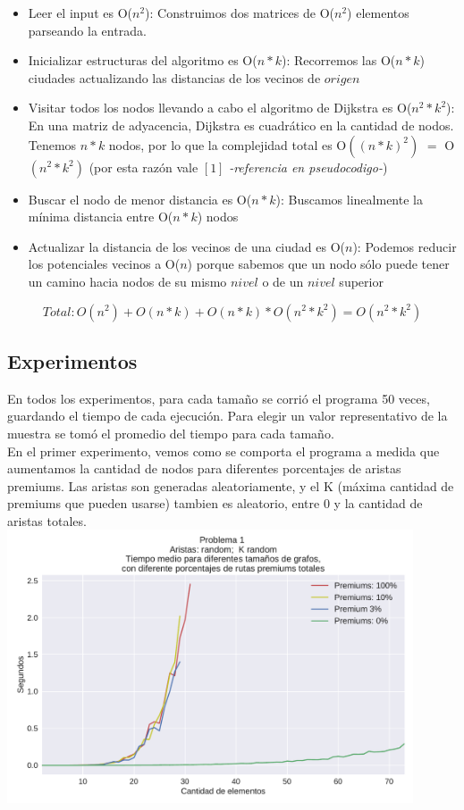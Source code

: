 \begin{itemize}
	\item Leer el input es O($n^2$): Construimos dos matrices de O($n^2$) elementos parseando la entrada.
	\item Inicializar estructuras del algoritmo es O($n*k$): Recorremos las O($n*k$) ciudades actualizando las distancias de los vecinos de $origen$
	\item Visitar todos los nodos llevando a cabo el algoritmo de Dijkstra es O($n^2*k^2$): En una matriz de adyacencia, Dijkstra es cuadrático en la cantidad de nodos. Tenemos $n*k$ nodos, por lo que la complejidad total es O$((n*k)^2)$ $=$ O$(n^2*k^2)$ (por esta razón vale  \label{whilejust}\hyperref[whileback]{$[1]$} \textit{-referencia en pseudocodigo-})
	\item Buscar el nodo de menor distancia es O($n*k$):  Buscamos linealmente la mínima distancia entre O($n*k$) nodos
	\item Actualizar la distancia de los vecinos de una ciudad es O($n$): Podemos reducir los potenciales vecinos a O($n$) porque sabemos que un nodo sólo puede tener un camino hacia nodos de su mismo $nivel$ o de un $nivel$ superior
\end{itemize}

$$Total:  O(n^2) + O(n*k) + O(n*k) * O(n^2*k^2) = O(n^2*k^2) $$

\subsection{Experimentos}

En todos los experimentos, para cada tamaño se corrió el programa 50 veces, guardando el tiempo de cada ejecución. Para elegir un valor representativo de la muestra se tomó el promedio del tiempo para cada tamaño. \\

En el primer experimento, vemos como se comporta el programa a medida que aumentamos la cantidad de nodos para diferentes porcentajes de aristas premiums. Las aristas son generadas aleatoriamente, y el K (máxima cantidad de premiums que pueden usarse) tambien es aleatorio, entre 0 y la cantidad de aristas totales. \\

{\centering
  \includegraphics[width=0.9\textwidth]{imagenes/problema1/todo_random_bis.pdf} \\
}

